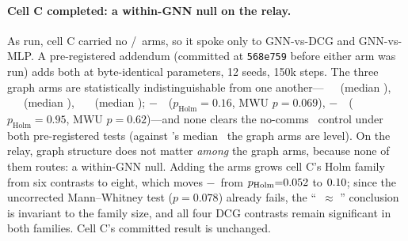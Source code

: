 \paragraph{Cell C completed: a within-GNN null on the relay.} As run, cell C
carried no \gwrong/\gcomplete\ arms, so it spoke only to GNN-vs-DCG and
GNN-vs-MLP. A pre-registered addendum (committed at \texttt{568e759} before
either arm was run) adds both at byte-identical parameters, 12 seeds, 150k
steps. The three graph arms are statistically indistinguishable from one
another---\gtrue\ \CBCgnn\ \CBCgnnCI\ (median \CBCgnnMed), \gcomplete\
\CRcomplete\ \CRcompleteCI\ (median \CRcompleteMed), \gwrong\ \CRwrong\
\CRwrongCI\ (median \CRwrongMed); \gtrue$-$\gwrong\ \CRtwGap\
($p_{\text{Holm}}{=}0.16$, MWU $p{=}0.069$), \gtrue$-$\gcomplete\ \CRtcGap\
($p_{\text{Holm}}{=}0.95$, MWU $p{=}0.62$)---and none clears the no-comms
\mlpqmix\ control under both pre-registered tests (against \mlpqmix's median
\CBCmlpMed\ the graph arms are level). On the relay, graph structure does not
matter \emph{among} the graph arms, because none of them routes: a within-GNN
null. Adding the arms grows cell C's Holm family from six contrasts to eight,
which moves \gtrue$-$\mlpqmix\ from $p_{\text{Holm}}{=}0.052$ to
$0.10$; since the uncorrected Mann--Whitney test ($p{=}0.078$) already
fails, the ``\gtrue\ $\approx$ \mlpqmix'' conclusion is invariant to the family
size, and all four DCG contrasts remain significant in both families. Cell C's
committed result is unchanged.

